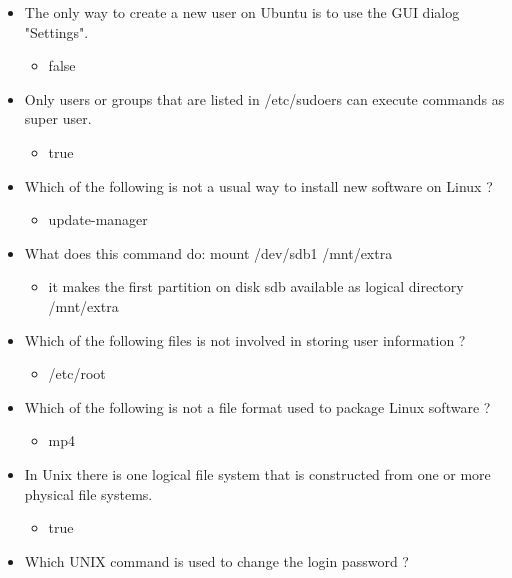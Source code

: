 \documentclass{report}
\begin{document}
    \pagebreak 
    \begin{itemize}
        \item The only way to create a new user on Ubuntu is to use the GUI dialog "Settings".
            \begin{itemize}
                \item false
            \end{itemize}
        \item Only users or groups that are listed in /etc/sudoers can execute commands as super user.
            \begin{itemize}
                \item true
            \end{itemize}
        \item Which of the following is not a usual way to install new software on Linux ?
            \begin{itemize}
                \item update-manager
            \end{itemize}
        \item What does this command do:  mount /dev/sdb1 /mnt/extra
            \begin{itemize}
                \item it makes the first partition on disk sdb available as logical directory /mnt/extra
            \end{itemize}
        \item Which of the following files is not involved in storing user information ?
            \begin{itemize}
                \item /etc/root 
            \end{itemize}
        \item Which of the following is not a file format used to package Linux software ?
            \begin{itemize}
                \item mp4
            \end{itemize}
        \item In Unix there is one logical file system that is constructed from one or more physical file systems.
            \begin{itemize}
                \item true
            \end{itemize}
        \item Which UNIX command is used to change the login password ?

\end{itemize}
\end{document}
